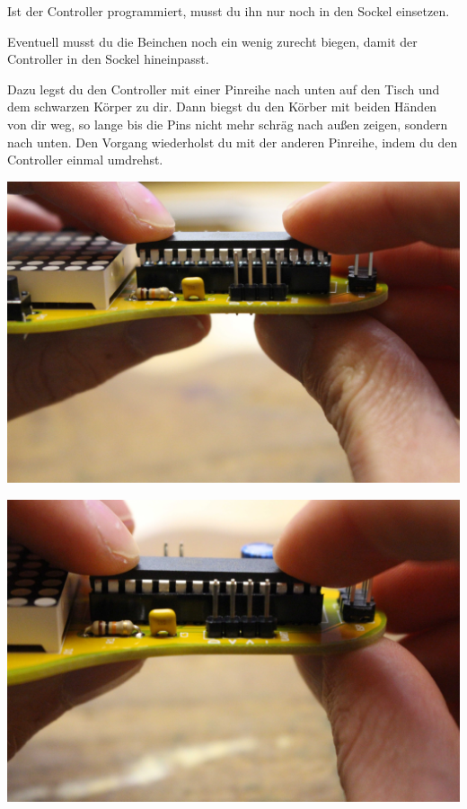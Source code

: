 \documentclass{article}
\begin{document}
Ist der Controller programmiert, musst du ihn nur noch in den Sockel einsetzen.

Eventuell musst du die Beinchen noch ein wenig zurecht biegen, damit der Controller in den Sockel hineinpasst. 

Dazu legst du den Controller mit einer Pinreihe nach unten auf den Tisch und dem schwarzen Körper zu dir. Dann biegst du den Körber mit beiden Händen von dir weg, so lange bis die Pins nicht mehr schräg nach außen zeigen, sondern nach unten.
Den Vorgang wiederholst du mit der anderen Pinreihe, indem du den Controller einmal umdrehst.

\vspace{1cm}

\begin{minipage}[b]{0.5\textwidth}
	\includegraphics[width=\textwidth]{Bilder/IMG_5620.JPG}
\end{minipage}
\begin{minipage}[b]{0.5\textwidth}
	\includegraphics[width=\textwidth]{Bilder/IMG_5622.JPG}
\end{minipage}
\end{document}
